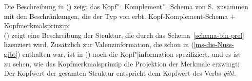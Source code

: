 Die Beschreibung in () zeigt das Kopf"=Komplement"=Schema 
von S.\,\pageref{schema-bin-prel} zusammen mit den
Beschränkungen, die der Typ  von  erbt.
\eas
Kopf-Komplement-Schema + Kopfmerkmalsprinzip:\\
\zs
() zeigt eine Beschreibung der Struktur, die durch das Schema~\ref{schema-bin-prel} lizenziert wird.
Zusätzlich zur Valenzinformation, die schon in (\ref{ms-die-Nuss-gibt}) enthalten war,
ist in () noch die Kopf"|information spezifiziert, und es ist zu sehen, wie
das Kopfmerkmalsprinzip die Projektion der Merkmale erzwingt: Der Kopfwert der gesamten Struktur
 entspricht dem Kopfwert des Verbs \emph{gibt}.
\ea
{}
\z

